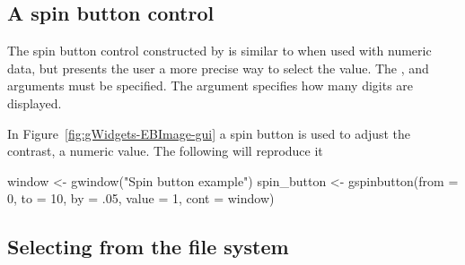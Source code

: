 \subsection{A spin button control}
\label{sec:gWidgets-spin-button-control}

The spin button control constructed by  is
similar to  when used with numeric data, but
presents the user a more precise way to select the value. The
,  and  arguments must be specified. The
argument  specifies how many digits are
displayed.

In Figure~\ref{fig:gWidgets-EBImage-gui} a spin button is used to
adjust the contrast, a numeric value. The following will reproduce it

\begin{Schunk}
\begin{Sinput}
 window <- gwindow("Spin button example")
 spin_button <- gspinbutton(from = 0, to = 10, by = .05, 
                            value = 1, cont = window)
\end{Sinput}
\end{Schunk}







\subsection{Selecting from the file system}
\label{sec:gWidgets-selecting-from-file}


